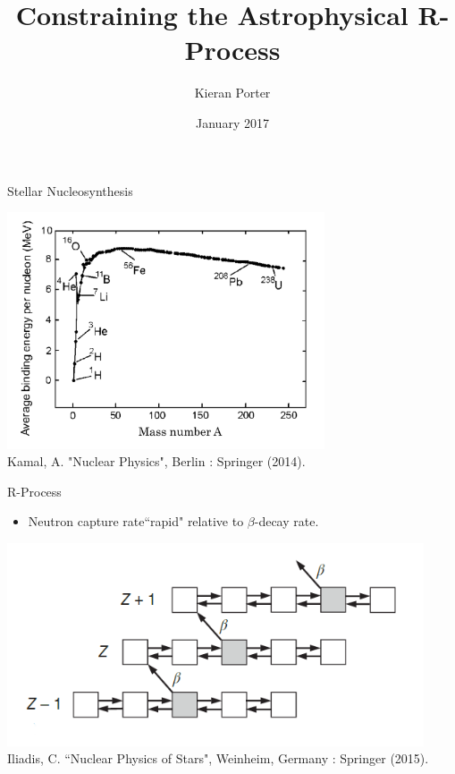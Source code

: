\documentclass{beamer}
\title{Constraining the Astrophysical R-Process}
\author[Kieran Porter]{Kieran Porter \newline{\tiny Supervisor: Dan Watts}}
\date{January 2017}
\begin{document}
\maketitle


\begin{frame}{Stellar Nucleosynthesis}
    
    
        \centering
        \includegraphics[height = 7cm]{BindingEnergy}
        \\{\tiny Kamal, A. "Nuclear Physics", Berlin : Springer (2014).}
       
    
\end{frame}


\begin{frame}{R-Process}

\begin{itemize}
    \item Neutron capture rate``rapid" relative to $\beta$-decay rate.
\end{itemize}

        \centering
        \includegraphics[height=6cm]{isotopicChain2}
        \\{\tiny Iliadis, C. ``Nuclear Physics of Stars", Weinheim, Germany : Springer (2015).}

\end{frame}
\end{document}
